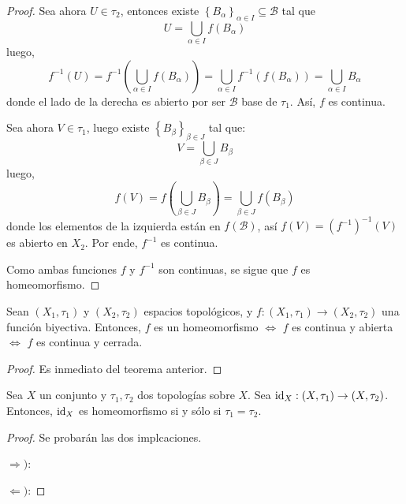 \documentclass[12pt]{report}
\theoremstyle{largebreak}
\newcommand\cf[3]{\ensuremath{#1:#2\rightarrow#3}}
\newcommand{\id}[1]{\ensuremath{\textup{id}_{#1}}}
\begin{document}
\begin{proof}
        Sea ahora $U\in\tau_2$, entonces existe $\left\{B_\alpha \right\}_{\alpha\in I}\subseteq\mathcal{B}$ tal que 
        \begin{equation*}
            U=\bigcup_{\alpha\in I}f(B_\alpha)
        \end{equation*}
        luego,
        \begin{equation*}
            f^{-1}(U)=f^{-1}\left(\bigcup_{\alpha\in I}f(B_\alpha)\right)=\bigcup_{\alpha\in I}f^{-1}(f(B_\alpha))=\bigcup_{\alpha\in I}B_\alpha
        \end{equation*}
        donde el lado de la derecha es abierto por ser $\mathcal{B}$ base de $\tau_1$. Así, $f$ es continua.

        Sea ahora $V\in\tau_1$, luego existe $\left\{B_\beta \right\}_{\beta\in J}$ tal que:
        \begin{equation*}
            V=\bigcup_{\beta\in J}B_\beta
        \end{equation*}
        luego,
        \begin{equation*}
            f(V)=f\left(\bigcup_{\beta\in J}B_\beta\right)=\bigcup_{\beta\in J}f(B_\beta)
        \end{equation*}
        donde los elementos de la izquierda están en $f(\mathcal{B})$, así $f(V)=(f^{-1})^{-1}(V)$ es abierto en $X_2$. Por ende, $f^{-1}$ es continua.

        Como ambas funciones $f$ y $f^{-1}$ son continuas, se sigue que $f$ es homeomorfismo.
    \end{proof}

    \begin{cor}
        Sean $(X_1,\tau_1)$ y $(X_2,\tau_2)$ espacios topológicos, y $\cf{f}{(X_1,\tau_1)}{(X_2,\tau_2)}$ una función biyectiva. Entonces, $f$ es un homeomorfismo $\iff$ $f$ es continua y abierta $\iff$ $f$ es continua y cerrada.
    \end{cor}

    \begin{proof}
        Es inmediato del teorema anterior.
    \end{proof}

    \begin{excer}
        Sea $X$ un conjunto y $\tau_1,\tau_2$ dos topologías sobre $X$. Sea $\cf{\id{X}}{(X,\tau_1)}{(X,\tau_2)}$. Entonces, $\id{X}$ es homeomorfismo si y sólo si $\tau_1=\tau_2$.
    \end{excer}

    \begin{proof}
        Se probarán las dos implcaciones.

        $\Rightarrow)$: 

        $\Leftarrow)$:

    \end{proof}
\end{document}
